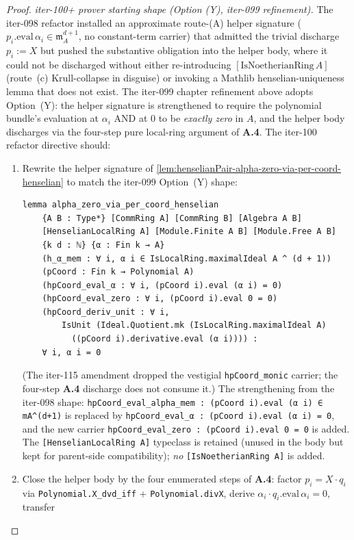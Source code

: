 \begin{proof}
\textit{iter-100+ prover starting shape (Option (Y), iter-099
refinement).} The iter-098 refactor installed an approximate
route-(A) helper signature
($p_i.\mathrm{eval}\,\alpha_i \in \mathfrak m_A^{d+1}$,
no constant-term carrier) that admitted the trivial discharge
$p_i := X$ but pushed the substantive obligation
into the helper body, where it could not be discharged without
either re-introducing $[\mathrm{IsNoetherianRing}\,A]$ (route~(c)
Krull-collapse in disguise) or invoking a Mathlib henselian-uniqueness
lemma that does not exist. The iter-099 chapter refinement above
adopts Option~(Y): the helper signature is strengthened to require
the polynomial bundle's evaluation at $\alpha_i$ AND at $0$ to be
\emph{exactly zero} in $A$, and the helper body discharges via the
four-step pure local-ring argument of \textbf{A.4}. The iter-100
refactor directive should:
\begin{enumerate}
\item Rewrite the helper signature of
\cref{lem:henselianPair-alpha-zero-via-per-coord-henselian} to
match the iter-099 Option~(Y) shape:
\begin{verbatim}
lemma alpha_zero_via_per_coord_henselian
    {A B : Type*} [CommRing A] [CommRing B] [Algebra A B]
    [HenselianLocalRing A] [Module.Finite A B] [Module.Free A B]
    {k d : ℕ} {α : Fin k → A}
    (h_α_mem : ∀ i, α i ∈ IsLocalRing.maximalIdeal A ^ (d + 1))
    (pCoord : Fin k → Polynomial A)
    (hpCoord_eval_α : ∀ i, (pCoord i).eval (α i) = 0)
    (hpCoord_eval_zero : ∀ i, (pCoord i).eval 0 = 0)
    (hpCoord_deriv_unit : ∀ i,
        IsUnit (Ideal.Quotient.mk (IsLocalRing.maximalIdeal A)
          ((pCoord i).derivative.eval (α i)))) :
    ∀ i, α i = 0
\end{verbatim}
(The iter-115 amendment dropped the vestigial
\texttt{hpCoord\_monic} carrier; the four-step \textbf{A.4}
discharge does not consume it.)
The strengthening from the iter-098 shape:
\texttt{hpCoord\_eval\_alpha\_mem : (pCoord i).eval (α i) ∈
mA\^{}(d+1)} is replaced by
\texttt{hpCoord\_eval\_α : (pCoord i).eval (α i) = 0},
and the new carrier
\texttt{hpCoord\_eval\_zero : (pCoord i).eval 0 = 0} is added.
The \texttt{[HenselianLocalRing A]} typeclass is retained
(unused in the body but kept for parent-side compatibility);
\emph{no} \texttt{[IsNoetherianRing A]} is added.
\item Close the helper body by the four enumerated steps of
\textbf{A.4}: factor $p_i = X \cdot q_i$ via
\texttt{Polynomial.X\_dvd\_iff} + \texttt{Polynomial.divX}, derive
$\alpha_i \cdot q_i.\mathrm{eval}\,\alpha_i = 0$, transfer

\end{enumerate}
\end{proof}
